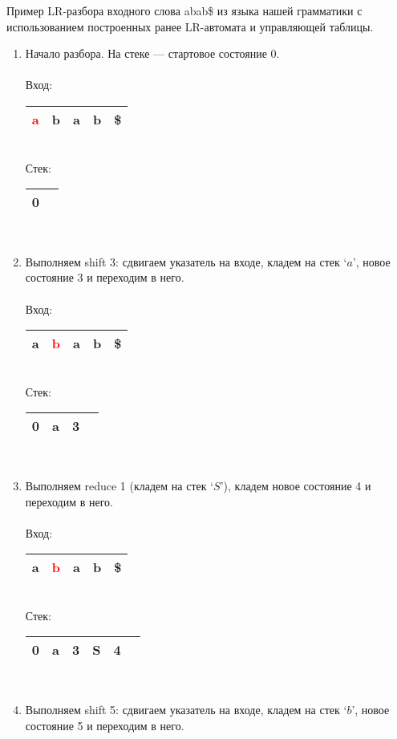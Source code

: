 \begin{example}
Пример LR-разбора входного слова abab\$ из языка нашей грамматики с использованием построенных ранее LR-автомата и управляющей таблицы.
\begin{enumerate}
\item Начало разбора. На стеке --- стартовое состояние 0. \\ \\
Вход: \,
\begin{tabular}[c]{ |c|c|c|c|c| }
    \hline \textcolor{red}{a} & b & a & b & \$ \\ \hline
\end{tabular} \\
Стек: \,
\begin{tabular}[c]{ |c|c }
    \hline 0 & \\ \hline
\end{tabular}
\\
\item Выполняем shift 3: сдвигаем указатель на входе, кладем на стек `$a$', новое состояние 3 и переходим в него. \\ \\
Вход: \,
\begin{tabular}[c]{ |c|c|c|c|c| }
    \hline a & \textcolor{red}{b} & a & b & \$ \\ \hline
\end{tabular} \\
Стек: \,
\begin{tabular}[c]{ |c|c|c|c }
    \hline 0 & a & 3 & \\ \hline
\end{tabular}
\\
\item Выполняем reduce 1 (кладем на стек `$S$'), кладем новое состояние 4 и переходим в него. \\ \\
Вход: \,
\begin{tabular}[c]{ |c|c|c|c|c| }
    \hline a & \textcolor{red}{b} & a & b & \$ \\ \hline
\end{tabular} \\
Стек: \,
\begin{tabular}[c]{ |c|c|c|c|c|c }
    \hline 0 & a & 3 & S & 4 & \\ \hline
\end{tabular}
\\
\item Выполняем shift 5: сдвигаем указатель на входе, кладем на стек `$b$', новое состояние 5 и переходим в него. \\ \\

\end{enumerate}
\end{example}
